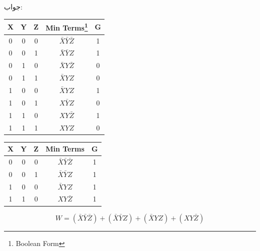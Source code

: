 \documentclass[pt, a5paper]{article}
\begin{document}
جواب:\\
\begin{LTR}
	\begin{tabular}{ c c c | c | c }		
		X & Y & Z & Min Terms\footnote{Boolean Form} & G \\
		\hline
		  0 & 0  & 0  & $\bar{X} \bar{Y} \bar{Z}$  &1 \\
		  0 & 0  & 1  & $\bar{X} \bar{Y} Z$  &1 \\
		  0 & 1  & 0  & $\bar{X} Y \bar{Z}$  &0 \\
		  0 & 1  & 1  & $\bar{X} Y Z$  &0 \\
		  1 & 0  & 0  & $\bar{X} Y Z$  &1 \\
		  1 & 0  & 1  & $X \bar{Y} Z$  &0 \\
		  1 & 1  & 0  & $X Y \bar{Z}$  &1 \\
		  1 & 1  & 1  & $X Y Z$  &0 \\
	\end{tabular}
\end{LTR}

\hfill \break
\begin{LTR}
	\begin{tabular}{ c c c | c | c }		
		X & Y & Z & Min Terms & G \\
		\hline
		  0 & 0  & 0  & $\bar{X} \bar{Y} \bar{Z}$  &1 \\
		  0 & 0  & 1  & $\bar{X} \bar{Y} Z$  &1 \\
		  1 & 0  & 0  & $\bar{X} Y Z$  &1 \\
		  1 & 1  & 0  & $X Y \bar{Z}$  &1 \\
	\end{tabular}
\end{LTR}

\begin{equation}
	W = (\bar{X} \bar{Y} \bar{Z}) +
	(\bar{X} \bar{Y} Z) +
	(\bar{X} Y Z) +
	(X Y \bar{Z})
\end{equation}
\newpage
\end{document}
